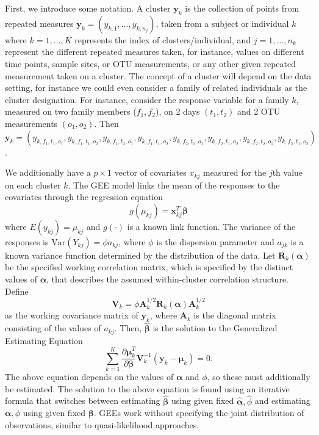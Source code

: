 \documentclass[12pt]{article}
\begin{document}
First, we introduce some notation. A cluster $\mathbf{y}_k$ is the collection of points from repeated measures $\mathbf{y}_k = (y_{k,1}, \ldots , y_{k,n_j})$, taken from a subject or individual $k$ where $k = 1, \ldots , K$ represents the index of clusters/individual, and $j = 1, \ldots , n_k$ represent the different repeated measures taken, for instance, values on different  time points, sample sites, or OTU measurements, or any other given repeated measurement taken on a cluster.
The concept of a cluster will depend on the data setting, for instance we could even consider a family of related individuals as the cluster designation. For instance, consider the response variable for a family $k$, measured on two family members ($f_1,f_2$), on 2 days $(t_1,t_2)$ and 2 OTU measurements $(o_1,o_2)$. Then $\mathbf{y}_k = (y_{k, f_1,t_1,o_1}, y_{k, f_1,t_1,o_2}, y_{k, f_1,t_2,o_1}, y_{k, f_1,t_1,o_2},y_{k, f_2,t_1,o_1}, y_{k, f_2,t_1,o_2}, y_{k, f_2,t_2,o_1}, y_{k, f_2,t_1,o_2})$.


We additionally have a $p \times 1$ vector of covariates $x_{kj}$ measured for the $j$th value on each cluster $k$. The GEE model links the mean of the responses to the covariates through the regression equation
$$g(\mu_{kj}) = \mathbf{x}_{kj}^T\boldsymbol \beta$$
where $E(y_{kj}) = \mu_{kj}$ and $g(\cdot)$ is a known link function. The variance of the responses is $\text{Var}(Y_{kj}) = \phi a_{kj}$, where $\phi$ is the dispersion parameter and $a_{jk}$ is a known variance function determined by the distribution of the data. Let $\mathbf{R}_k(\boldsymbol\alpha)$ be the specified working correlation matrix, which is specified by the distinct values of $\boldsymbol\alpha$, that describes the assumed within-cluster correlation structure. Define
$$\mathbf{V}_k = \phi \mathbf{A}_k^{1/2} \mathbf{R}_{k}(\boldsymbol\alpha)\mathbf{A}_k^{1/2}$$ as the working covariance matrix of $\mathbf{y}_k$, where $\mathbf{A}_k$ is the diagonal matrix consisting of the values of $a_{kj}$. Then, $\hat{\boldsymbol\beta}$ is the solution to the Generalized Estimating Equation
$$\sum_{k=1}^K \frac{\partial  \boldsymbol\mu_k^T }{\partial \boldsymbol\beta } \mathbf{V}_{k}^{-1} (\mathbf{y}_k - \boldsymbol{\mu}_k) = 0. $$
The above equation depends on the values of $\boldsymbol\alpha$ and $\phi$, so these must additionally be estimated. The solution to the above equation is found using an iterative formula that switches between estimating $\hat{\boldsymbol\beta}$ using given fixed $\hat{\boldsymbol\alpha}, \hat \phi$ and estimating $\boldsymbol\alpha,  \phi$ using given fixed $\boldsymbol\beta$. GEEs work without specifying the joint distribution of observations, similar to quasi-likelihood approaches.
\end{document}
